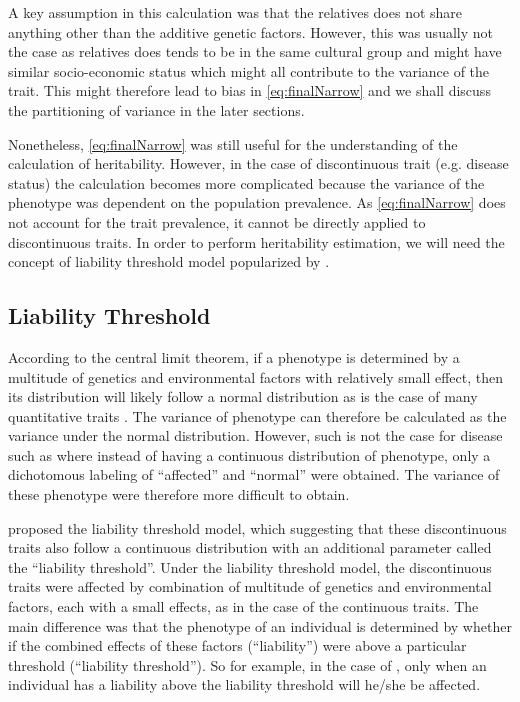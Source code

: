 	A key assumption in this calculation was that the relatives does not share anything other than the additive genetic factors.
	However, this was usually not the case as relatives does tends to be in the same cultural group and might have similar socio-economic status which might all contribute to the variance of the trait.
	This might therefore lead to bias in \cref{eq:finalNarrow} and we shall discuss the partitioning of variance in the later sections.
	
	Nonetheless, \cref{eq:finalNarrow} was still useful for the understanding of the calculation of heritability.
	However, in the case of discontinuous trait (e.g. disease status) the calculation becomes more complicated because the variance of the phenotype was dependent on the population prevalence.
	As \cref{eq:finalNarrow} does not account for the trait prevalence, it cannot be directly applied to discontinuous traits.
	In order to perform heritability estimation, we will need the concept of liability threshold model popularized by \cite{Falconer1965}.
	
	\subsection{Liability Threshold}
	\label{sec:liability}
	According to the central limit theorem, if a phenotype is determined by a multitude of genetics and environmental factors with relatively small effect, then its distribution will likely follow a normal distribution as is the case of many quantitative traits \citep{Visscher2008}. %
	The variance of phenotype can therefore be calculated as the variance under the normal distribution.
	However, such is not the case for disease such as  where instead of having a continuous distribution of phenotype, only a dichotomous labeling of ``affected'' and ``normal'' were obtained.
	The variance of these phenotype were therefore more difficult to obtain.
	
	\citet{Falconer1965} proposed the liability threshold model, which suggesting that these discontinuous traits also follow a continuous distribution with an additional parameter called the ``liability threshold''.
	Under the liability threshold model, the discontinuous traits were affected by combination of multitude of genetics and environmental factors, each with a small effects, as in the case of the continuous traits.
	The main difference was that the phenotype of an individual is determined by whether if the combined effects of these factors (``liability'') were above a particular threshold (``liability threshold'').
	So for example, in the case of , only when an individual has a liability above the liability threshold will he/she be affected.
	
